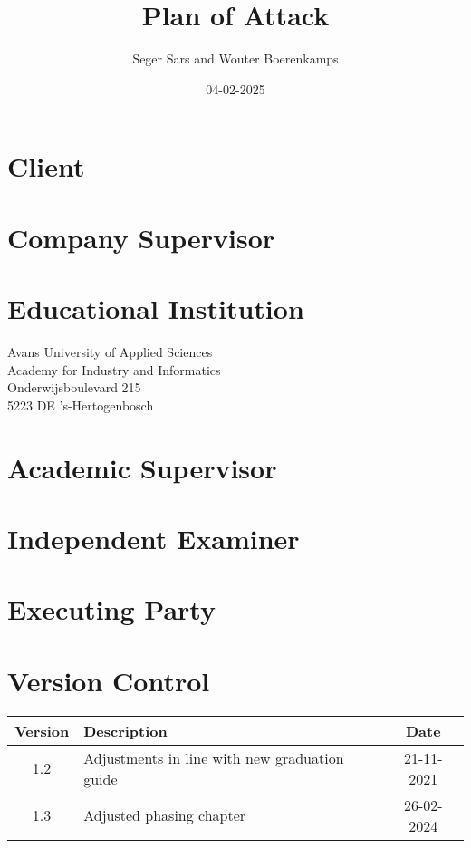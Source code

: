 \documentclass{article}
\title{Plan of Attack}
\author{Seger Sars and Wouter Boerenkamps}
\date{04-02-2025}
\begin{document}
\maketitle

\newpage

\section*{Client}

\section*{Company Supervisor}

\section*{Educational Institution}
Avans University of Applied Sciences \\
Academy for Industry and Informatics \\
Onderwijsboulevard 215 \\
5223 DE 's-Hertogenbosch

\section*{Academic Supervisor}

\section*{Independent Examiner}

\section*{Executing Party}

\newpage

\section*{Version Control}

\begin{tabular}{|c|l|c|}
    \hline
    Version & Description & Date \\
    \hline
    1.2 & Adjustments in line with new graduation guide & 21-11-2021 \\
    1.3 & Adjusted phasing chapter & 26-02-2024 \\
    \hline
\end{tabular}
\end{document}
